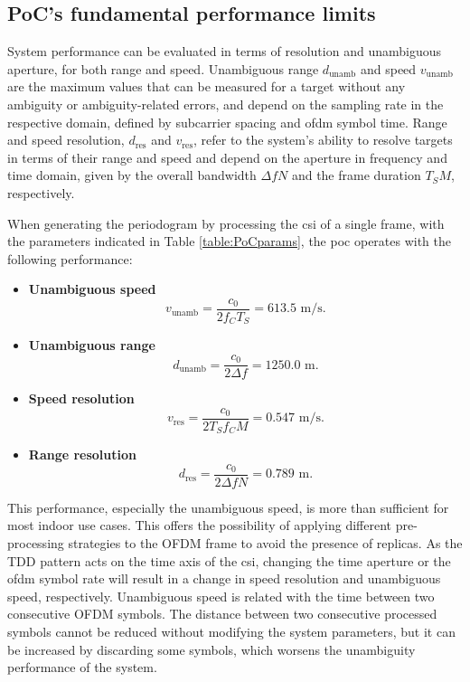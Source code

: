 	\subsection{PoC's fundamental performance limits}
		
		System performance can be evaluated in terms of resolution and unambiguous aperture, for both range and speed.
		Unambiguous range $d_{\text{unamb}}$ and speed $v_{\text{unamb}}$ are the maximum values that can be measured for a target without any ambiguity or ambiguity-related errors, and depend on the sampling rate in the respective domain, defined by subcarrier spacing and \gls{ofdm} symbol time.
		Range and speed resolution, $d_{\text{res}}$ and $v_{\text{res}}$, refer to the system's ability to resolve targets in terms of their range and speed and depend on the aperture in frequency and time domain, given by the overall bandwidth $\Delta f N$ and the frame duration $T_S M$, respectively. 
	
		When generating the periodogram by processing the \gls{csi} of a single frame, with the parameters indicated in Table \ref{table:PoCparams},
		the \gls{poc} operates with the following performance:
		
		\begin{itemize}
			\item \textbf{Unambiguous speed}
			\vspace{-\baselineskip} %
			\begin{equation}
				v_{\text{unamb}} = \frac{c_0}{2f_C T_S} = 613.5\text{ m/s}.
			\end{equation}
			
			\item \textbf{Unambiguous range}
			\begin{equation}
				d_{\text{unamb}} = \frac{c_0}{2\Delta f} = 1250.0\text{ m}.
			\end{equation}
			\item \textbf{Speed resolution}
			\begin{equation}
				v_{\text{res}} = \frac{c_0}{2T_Sf_CM} = 0.547 \text{ m/s}.
			\end{equation} 
			\item \textbf{Range resolution}
			\begin{equation}
				d_{\text{res}} = \frac{c_0}{2\Delta fN} = 0.789 \text{ m}.
			\end{equation}  
		\end{itemize}
			This performance, especially the unambiguous speed, is more than sufficient for most indoor use cases. 
			This offers the possibility of applying different pre-processing strategies to the OFDM frame to avoid the presence of replicas. 
			As the TDD pattern acts on the time axis of the \gls{csi}, changing the time aperture or the \gls{ofdm} symbol rate will result in a change in speed resolution and unambiguous speed, respectively.
			Unambiguous speed is related with the time between two consecutive OFDM symbols. The distance between two consecutive processed symbols cannot be reduced without modifying the system parameters, but it can be increased by discarding some symbols, which worsens the unambiguity performance of the system.
			
